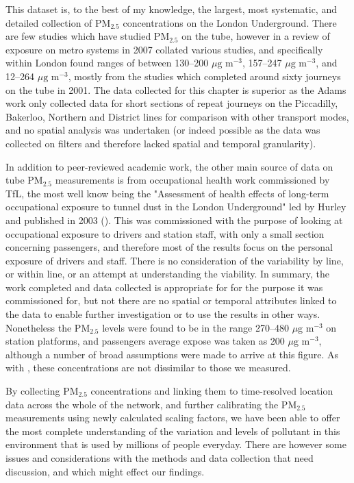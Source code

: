 This dataset is, to the best of my knowledge, the largest, most systematic, and detailed collection of PM$_{2.5}$ concentrations on the London Underground. There are few studies which have studied PM$_{2.5}$ on the tube, however in a review of exposure on metro systems in 2007 \cite{Nieuwenhuijsen2007} collated various studies, and specifically within London found ranges of between 130--200 $\mu \text{g m}^{-3}$, 157--247 $\mu \text{g m}^{-3}$, and 12--264 $\mu \text{g m}^{-3}$, mostly from the \cite{Adams2001a} studies which completed around sixty journeys on the tube in 2001. The data collected for this chapter is superior as the Adams work only collected data for short sections of repeat journeys on the Piccadilly, Bakerloo, Northern and District lines for comparison with other transport modes, and no spatial analysis was undertaken (or indeed possible as the data was collected on filters and therefore lacked spatial and temporal granularity). 

In addition to peer-reviewed academic work, the other main source of data on tube PM$_{2.5}$ measurements is from occupational health work commissioned by TfL, the most well know being the "Assessment of health effects of long-term occupational exposure to tunnel dust in the London Underground" led by Hurley and published in 2003 (\cite{Hurley2003}). This was commissioned with the purpose of looking at occupational exposure to drivers and station staff, with only a small section concerning passengers, and therefore most of the results focus on the personal exposure of drivers and staff. There is no consideration of the variability by line, or within line, or an attempt at understanding the viability. In summary, the work completed and data collected is appropriate for for the purpose it was commissioned for, but not there are no spatial or temporal attributes linked to the data to enable further investigation or to use the results in other ways. Nonetheless the PM$_{2.5}$ levels were found to be in the range 270--480 $\mu \text{g m}^{-3}$ on station platforms, and passengers average expose was taken as 200 $\mu \text{g m}^{-3}$, although a number of broad assumptions were made to arrive at this figure. As with \cite{Nieuwenhuijsen2007}, these concentrations are not dissimilar to those we measured.

By collecting PM$_{2.5}$ concentrations and linking them to time-resolved location data across the whole of the network, and further calibrating the PM$_{2.5}$ measurements using newly calculated scaling factors, we have been able to offer the most complete understanding of the variation and levels of pollutant in this environment that is used by millions of people everyday. There are however some issues and considerations with the methods and data collection that need discussion, and which might effect our findings. 

